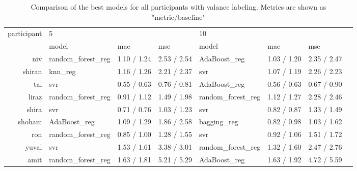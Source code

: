 \documentclass[../main.tex]{subfiles}
\begin{document}
\begin{table}[!h]
    \begin{tabular}{rlllllll}
        \toprule
        participant &  \multicolumn{3}{l}{5} & \multicolumn{3}{l}{10} \\
              &              model & mae & mse &              model & mae & mse \\
        \midrule
            niv &  random\_forest\_reg &         1.10 / 1.24 &        2.53 / 2.54 &       AdaBoost\_reg &         1.03 / 1.20 &        2.35 / 2.47 \\
         shiran &            knn\_reg &         1.16 / 1.26 &        2.21 / 2.37 &                svr &         1.07 / 1.19 &        2.26 / 2.23 \\
            tal &                svr &         0.55 / 0.63 &        0.76 / 0.81 &       AdaBoost\_reg &         0.56 / 0.63 &        0.67 / 0.90 \\
          liraz &  random\_forest\_reg &         0.91 / 1.12 &        1.49 / 1.98 &  random\_forest\_reg &         1.12 / 1.27 &        2.28 / 2.46 \\
          shira &                svr &         0.71 / 0.76 &        1.03 / 1.23 &                svr &         0.82 / 0.87 &        1.33 / 1.49 \\
         shoham &       AdaBoost\_reg &         1.09 / 1.29 &        1.86 / 2.58 &        bagging\_reg &         0.82 / 0.98 &        1.03 / 1.62 \\
            ron &  random\_forest\_reg &         0.85 / 1.00 &        1.28 / 1.55 &                svr &         0.92 / 1.06 &        1.51 / 1.72 \\
          yuval &                svr &         1.53 / 1.61 &        3.38 / 3.01 &  random\_forest\_reg &         1.32 / 1.60 &        2.47 / 2.76 \\
           amit &  random\_forest\_reg &         1.63 / 1.81 &        5.21 / 5.29 &       AdaBoost\_reg &         1.63 / 1.92 &        4.72 / 5.59 \\
        \bottomrule
    \end{tabular}        
    \caption{Comparison of the best models for all participants with valance labeling. Metrics are shown as "metric/baseline"}
\end{table}
\end{document}
